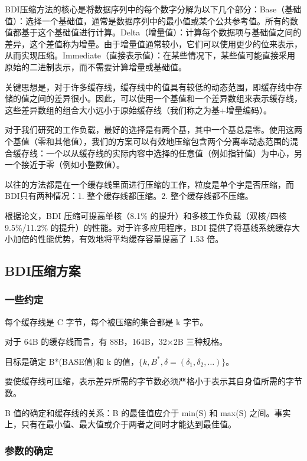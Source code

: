 \documentclass[12pt]{article}
\begin{document}
BDI压缩方法的核心是将数据序列中的每个数字分解为以下几个部分：Base（基础值）：选择一个基础值，通常是数据序列中的最小值或某个公共参考值。所有的数值都基于这个基础值进行计算。Delta（增量值）：计算每个数据项与基础值之间的差异，这个差值称为增量。由于增量值通常较小，它们可以使用更少的位来表示，从而实现压缩。Immediate（直接表示值）：在某些情况下，某些值可能直接采用原始的二进制表示，而不需要计算增量或基础值。

关键思想是，对于许多缓存线，缓存线中的值具有较低的动态范围，即缓存线中存储的值之间的差异很小。因此，可以使用一个基值和一个差异数组来表示缓存线，这些差异数组的组合大小远小于原始缓存线（我们称之为基+增量编码）。

对于我们研究的工作负载，最好的选择是有两个基，其中一个基总是零。使用这两个基值（零和其他值），我们的方案可以有效地压缩包含两个分离率动态范围的混合缓存线：一个以从缓存线的实际内容中选择的任意值（例如指针值）为中心，另一个接近于零（例如小整数值）。

以往的方法都是在一个缓存线里面进行压缩的工作，粒度是单个字是否压缩，而BDI只有两种情况：1. 整个缓存线都压缩。2. 整个缓存线都不压缩。

根据论文，BDI 压缩可提高单核（8.1\% 的提升）和多核工作负载（双核/四核 9.5\%/11.2\% 的提升）的性能。对于许多应用程序，BDI 提供了将基线系统缓存大小加倍的性能优势，有效地将平均缓存容量提高了 1.53 倍。


\subsection{BDI压缩方案}

\subsubsection{一些约定}

每个缓存线是 C 字节，每个被压缩的集合都是 k 字节。

对于 64B 的缓存线而言，有 88B，164B，32$\times$2B 三种规格。

目标是确定 B*(BASE值)和 k 的值，$\{k,B^*,\delta = (\delta_1,\delta_2,\dots)\}$。

要使缓存线可压缩，表示差异所需的字节数必须严格小于表示其自身值所需的字节数。

B 值的确定和缓存线的关系：B 的最佳值应介于 min(S) 和 max(S) 之间。事实上，只有在最小值、最大值或介于两者之间时才能达到最佳值。

\subsubsection{参数的确定}
\end{document}
